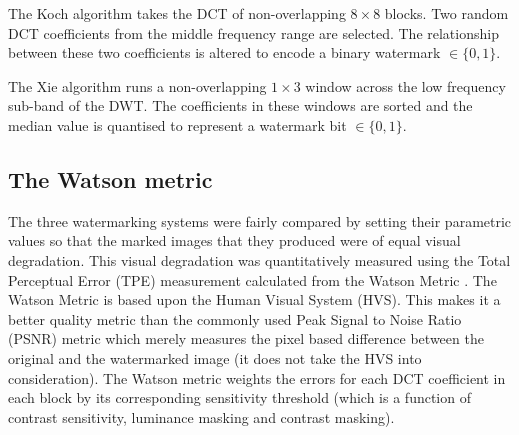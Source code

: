 \documentclass[10pt,twocolumn]{article}
\begin{document}
The Koch algorithm takes the DCT of non-overlapping $8 \times 8$ blocks. Two random DCT coefficients from the middle frequency range
are selected. The relationship between these two coefficients is altered to encode a binary watermark $\in\{0,1\}$.

The Xie algorithm runs a non-overlapping $1 \times 3$ window across the low frequency sub-band of the DWT. The coefficients in
these windows are sorted and the median value is quantised to represent a watermark bit $\in\{0,1\}$.

\subsection{The Watson metric}
The three watermarking systems were fairly compared by setting their parametric values so that
the marked images that they produced were of equal visual degradation. This visual degradation was
quantitatively measured using the Total Perceptual Error (TPE) measurement calculated from the 
Watson Metric \cite{watson1Pap}. 
The Watson Metric is based upon the Human Visual System (HVS).
This makes it a better quality metric than the commonly used Peak Signal to Noise Ratio (PSNR) metric which merely measures the pixel based
difference between the original and the watermarked image (it does not take the HVS into consideration).
The Watson metric weights the errors for each DCT coefficient in each block by its corresponding sensitivity threshold
(which is a function of contrast sensitivity, luminance masking and contrast masking). 
\end{document}
